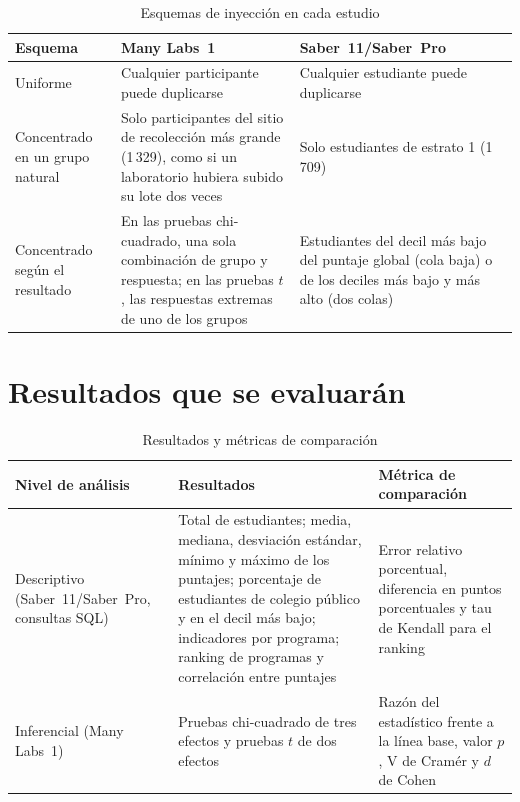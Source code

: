 \documentclass[11pt,openany,oneside,letterpaper]{book}
\begin{document}
\begin{table}[H]
\centering
\caption{Esquemas de inyección en cada estudio}
\label{tab:esquemas}
\small
\begin{tabularx}{\textwidth}{>{\raggedright\arraybackslash}p{3.2cm} >{\raggedright\arraybackslash}X >{\raggedright\arraybackslash}X}
\toprule
\textbf{Esquema} & \textbf{Many Labs~1} & \textbf{Saber~11/Saber~Pro} \\
\midrule
Uniforme & Cualquier participante puede duplicarse & Cualquier estudiante puede duplicarse \\
Concentrado en un grupo natural & Solo participantes del sitio de recolección más grande (1\,329), como si un laboratorio hubiera subido su lote dos veces & Solo estudiantes de estrato 1 (1\,709) \\
Concentrado según el resultado & En las pruebas chi-cuadrado, una sola combinación de grupo y respuesta; en las pruebas $t$, las respuestas extremas de uno de los grupos & Estudiantes del decil más bajo del puntaje global (cola baja) o de los deciles más bajo y más alto (dos colas) \\
\bottomrule
\end{tabularx}
\end{table}

\section{Resultados que se evaluarán}

\begin{table}[H]
\centering
\caption{Resultados y métricas de comparación}
\label{tab:resultados}
\small
\begin{tabularx}{\textwidth}{>{\raggedright\arraybackslash}p{2.7cm} >{\raggedright\arraybackslash}X >{\raggedright\arraybackslash}X}
\toprule
\textbf{Nivel de análisis} & \textbf{Resultados} & \textbf{Métrica de comparación} \\
\midrule
Descriptivo (Saber~11/Saber~Pro, consultas SQL) & Total de estudiantes; media, mediana, desviación estándar, mínimo y máximo de los puntajes; porcentaje de estudiantes de colegio público y en el decil más bajo; indicadores por programa; ranking de programas y correlación entre puntajes & Error relativo porcentual, diferencia en puntos porcentuales y tau de Kendall para el ranking \\
\addlinespace
Inferencial (Many Labs~1) & Pruebas chi-cuadrado de tres efectos y pruebas $t$ de dos efectos & Razón del estadístico frente a la línea base, valor $p$, V de Cramér y $d$ de Cohen \\
\bottomrule
\end{tabularx}
\end{table}
\end{document}
